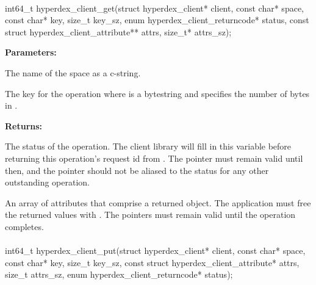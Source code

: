 
\paragraph{}
\begin{ccode}
int64_t hyperdex_client_get(struct hyperdex_client* client,
                const char* space,
                const char* key, size_t key_sz,
                enum hyperdex_client_returncode* status,
                const struct hyperdex_client_attribute** attrs, size_t* attrs_sz);
\end{ccode}
\funcdesc 

\noindent\textbf{Parameters:}
\begin{description}[labelindent=\widthof{{\code{key}, \code{key\_sz}}},leftmargin=*,noitemsep,nolistsep,align=right]
\item[\code{space}] The name of the space as a c-string.
\item[\code{key}, \code{key\_sz}] The key for the operation where  is a bytestring and  specifies the number of bytes in .
\end{description}

\noindent\textbf{Returns:}
\begin{description}[labelindent=\widthof{{\code{attrs}, \code{attrs\_sz}}},leftmargin=*,noitemsep,nolistsep,align=right]
\item[\code{status}] The status of the operation.  The client library will fill in this variable before returning this operation's request id from .  The pointer must remain valid until then, and the pointer should not be aliased to the status for any other outstanding operation.
\item[\code{attrs}, \code{attrs\_sz}] An array of attributes that comprise a returned object.  The application must free the returned values with .  The pointers must remain valid until the operation completes.
\end{description}

\paragraph{}
\begin{ccode}
int64_t hyperdex_client_put(struct hyperdex_client* client,
                const char* space,
                const char* key, size_t key_sz,
                const struct hyperdex_client_attribute* attrs, size_t attrs_sz,
                enum hyperdex_client_returncode* status);
\end{ccode}
\funcdesc 

